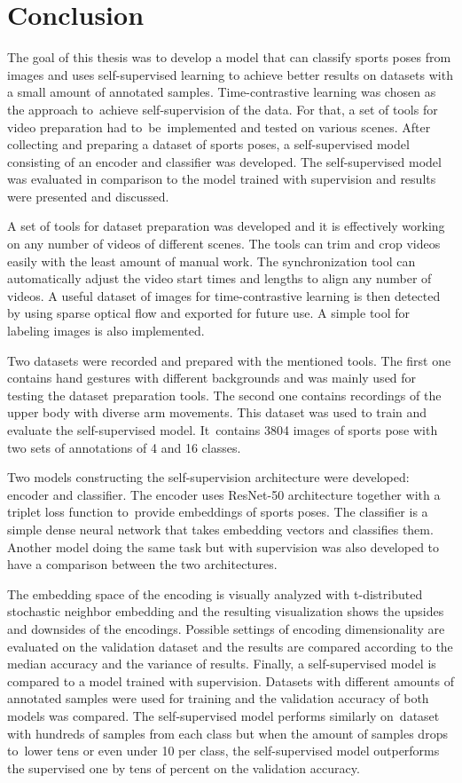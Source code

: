 \chapter{\label{chap:conclusion}Conclusion}

The goal of this thesis was to develop a model that can classify sports poses from images and uses self-supervised learning to achieve better results on datasets with a small amount of annotated samples. Time-contrastive learning was chosen as the approach to~achieve self-supervision of the data. For that, a set of tools for video preparation had to~be~implemented and tested on various scenes. After collecting and preparing a dataset of sports poses, a self-supervised model consisting of an encoder and classifier was developed. The self-supervised model was evaluated in comparison to the model trained with supervision and results were presented and discussed. 

A set of tools for dataset preparation was developed and it is effectively working on any number of videos of different scenes. The tools can trim and crop videos easily with the least amount of manual work. The synchronization tool can automatically adjust the video start times and lengths to align any number of videos. A useful dataset of images for time-contrastive learning is then detected by using sparse optical flow and exported for future use. A simple tool for labeling images is also implemented.

Two datasets were recorded and prepared with the mentioned tools. The first one contains hand gestures with different backgrounds and was mainly used for testing the dataset preparation tools. The second one contains recordings of the upper body with diverse arm movements. This dataset was used to train and evaluate the self-supervised model. It~contains 3804 images of sports pose with two sets of annotations of 4 and 16 classes.

Two models constructing the self-supervision architecture were developed: encoder and classifier. The encoder uses ResNet-50 architecture together with a triplet loss function to~provide embeddings of sports poses. The classifier is a simple dense neural network that takes embedding vectors and classifies them. Another model doing the same task but with supervision was also developed to have a comparison between the two architectures.

The embedding space of the encoding is visually analyzed with t-distributed stochastic neighbor embedding and the resulting visualization shows the upsides and downsides of the encodings. Possible settings of encoding dimensionality are evaluated on the validation dataset and the results are compared according to the median accuracy and the variance of results. Finally, a self-supervised model is compared to a model trained with supervision. Datasets with different amounts of annotated samples were used for training and the validation accuracy of both models was compared. The self-supervised model performs similarly on~dataset with hundreds of samples from each class but when the amount of samples drops to~lower tens or even under 10 per class, the self-supervised model outperforms the supervised one by tens of percent on the validation accuracy.


